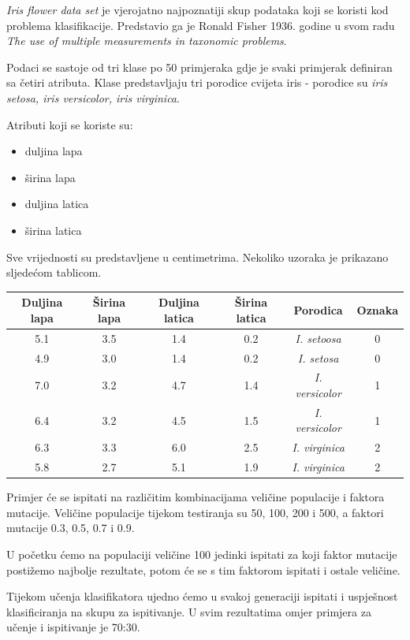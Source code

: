 \documentclass[times, utf8, zavrsni]{fer}
\begin{document}
\textit{Iris flower data set} je vjerojatno najpoznatiji skup podataka koji se koristi kod problema klasifikacije. Predstavio ga je Ronald Fisher 1936. godine u svom radu \textit{The use of multiple measurements in taxonomic problems}.

Podaci se sastoje od tri klase po 50 primjeraka gdje je svaki primjerak definiran sa četiri atributa. Klase predstavljaju tri porodice cvijeta iris - porodice su \textit{iris setosa, iris versicolor, iris virginica}.

Atributi koji se koriste su:
\begin{itemize}
\item duljina lapa
\item širina lapa
\item duljina latica
\item širina latica
\end{itemize}


Sve vrijednosti su predstavljene u centimetrima.
Nekoliko uzoraka je prikazano sljedećom tablicom.
\newpage
{}
\begin{center}
\begin{tabular}{|c|c|c|c|c|c|}
\hline
Duljina lapa & Širina lapa & Duljina latica & Širina latica & Porodica & Oznaka \\
\hline
5.1 & 3.5 & 1.4 & 0.2 & \textit{I. setoosa} & 0 \\
\hline
4.9 & 3.0 & 1.4 & 0.2 & \textit{I. setosa} & 0\\
\hline
7.0 & 3.2 & 4.7 & 1.4 & \textit{I. versicolor} & 1\\
\hline
6.4 & 3.2 & 4.5 & 1.5 & \textit{I. versicolor} & 1\\
\hline
6.3 & 3.3 & 6.0 & 2.5 & \textit{I. virginica} & 2\\
\hline
5.8 & 2.7 & 5.1 & 1.9 & \textit{I. virginica} & 2\\
\hline
\end{tabular}
\end{center}

Primjer će se ispitati na različitim kombinacijama veličine populacije i faktora mutacije. Veličine populacije tijekom testiranja su 50, 100, 200 i 500, a faktori mutacije 0.3, 0.5, 0.7 i 0.9.

U početku ćemo na populaciji veličine 100 jedinki ispitati za koji faktor mutacije postižemo najbolje rezultate, potom će se s tim faktorom ispitati i ostale veličine.

Tijekom učenja klasifikatora ujedno ćemo u svakoj generaciji ispitati i uspješnost klasificiranja na skupu za ispitivanje. U svim rezultatima omjer primjera za učenje i ispitivanje je 70:30.
\end{document}
